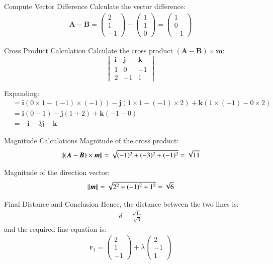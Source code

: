 \documentclass{beamer}
\newcommand{\myvec}[1]{\ensuremath{\begin{pmatrix}#1\end{pmatrix}}}
\renewcommand{\vec}[1]{\boldsymbol{#1}} %
\begin{document}
\begin{frame}{Compute Vector Difference}
Calculate the vector difference:
\begin{align}
\vec{A} - \vec{B} = \myvec{2 \\ 1 \\ -1} - \myvec{1 \\ 1 \\ 0} = \myvec{1 \\ 0 \\ -1}
\end{align}
\end{frame}

\begin{frame}{Cross Product Calculation}
Calculate the cross product \((\vec{A} - \vec{B}) \times \vec{m}\):
\[
\begin{vmatrix}
\vec{i} & \vec{j} & \vec{k} \\
1 & 0 & -1 \\
2 & -1 & 1
\end{vmatrix}
\]

Expanding:
\begin{align}
&= \vec{i}(0 \times 1 - (-1) \times (-1)) - \vec{j}(1 \times 1 - (-1) \times 2) + \vec{k}(1 \times (-1) - 0 \times 2) \\
&= \vec{i}(0 - 1) - \vec{j}(1 + 2) + \vec{k}(-1 - 0) \\
&= -\vec{i} - 3\vec{j} - \vec{k}
\end{align}
\end{frame}

\begin{frame}{Magnitude Calculations}
Magnitude of the cross product:
\begin{align}
\norm{(\vec{A} - \vec{B}) \times \vec{m}} = \sqrt{(-1)^2 + (-3)^2 + (-1)^2} = \sqrt{11}
\end{align}

Magnitude of the direction vector:
\begin{align}
\norm{\vec{m}} = \sqrt{2^2 + (-1)^2 + 1^2} = \sqrt{6}
\end{align}
\end{frame}

\begin{frame}{Final Distance and Conclusion}
Hence, the distance between the two lines is:
\begin{align}
d = \frac{\sqrt{11}}{\sqrt{6}}
\end{align}
and the required line equation is:
\begin{align}
\vec{r}_1 = \myvec{2 \\ 1 \\ -1} + \lambda \myvec{2 \\ -1 \\ 1}
\end{align}
\end{frame}
\end{document}
